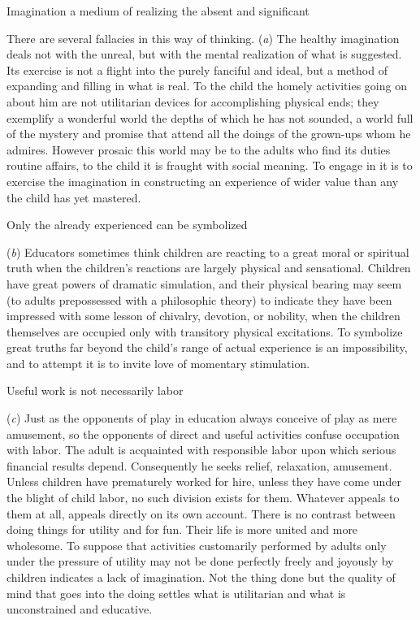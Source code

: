 \documentclass[letterpaper]{book}
\begin{document}
Imagination a medium of realizing the absent and significant

There are several fallacies in this way of thinking. (\emph{a}) The
healthy imagination deals not with the unreal, but with the mental
realization of what is suggested. Its exercise is not a flight into the
purely fanciful and ideal, but a method of expanding and filling in what
is real. To the child the homely activities going on about him are not
utilitarian devices for accomplishing physical ends; they exemplify a
wonderful world the depths of which he has not sounded, a world full of
the mystery and promise that attend all the doings of the grown-ups whom
he admires. However prosaic this world may be to the adults who find its
duties routine affairs, to the child it is fraught with social meaning.
To engage in it is to exercise the imagination in constructing an
experience of wider value than any the child has yet mastered.

Only the already experienced can be symbolized

(\emph{b}) Educators sometimes think children are reacting to a great
moral or spiritual truth when the children's reactions are largely
physical and sensational. Children have great powers of dramatic
simulation, and their physical bearing may seem (to adults prepossessed
with a philosophic theory) to indicate they have been impressed with
some lesson of chivalry, devotion, or nobility, when the children
themselves are occupied
only
with transitory physical excitations. To symbolize great truths far
beyond the child's range of actual experience is an impossibility, and
to attempt it is to invite love of momentary stimulation.

Useful work is not necessarily labor

(\emph{c}) Just as the opponents of play in education always conceive of
play as mere amusement, so the opponents of direct and useful activities
confuse occupation with labor. The adult is acquainted with responsible
labor upon which serious financial results depend. Consequently he seeks
relief, relaxation, amusement. Unless children have prematurely worked
for hire, unless they have come under the blight of child labor, no such
division exists for them. Whatever appeals to them at all, appeals
directly on its own account. There is no contrast between doing things
for utility and for fun. Their life is more united and more wholesome.
To suppose that activities customarily performed by adults only under
the pressure of utility may not be done perfectly freely and joyously by
children indicates a lack of imagination. Not the thing done but the
quality of mind that goes into the doing settles what is utilitarian and
what is unconstrained and educative.
\end{document}
